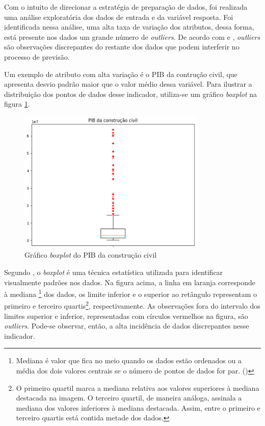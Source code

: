 Com o intuito de direcionar a estratégia de preparação de dados,
foi realizada uma análise exploratória dos dados de 
entrada e da variável resposta. 
Foi identificada nessa análise, uma alta
taxa de variação dos atributos,
dessa forma, está presente nos dados um grande número de \textit{outliers}.
De acordo com \citet{outliers} e \citet{tukey77}, \textit{outliers} são
observações discrepantes do restante dos dados
que podem interferir no processo de previsão. 

Um exemplo de atributo com alta variação é o PIB da contrução civil,
que apresenta desvio padrão maior que o valor médio dessa variável.
Para ilustrar a distribuição dos pontos de dados desse indicador, utiliza-se 
um gráfico \textit{boxplot} na figura \ref{fig:boxplot_pibcc}.

\begin{figure}[H]
    \centering
    \includegraphics[width=9cm]{../figuras/graficos/boxplot-pib-cc.png}
    \caption{Gráfico \textit{boxplot} do PIB da construção civil}
    \label{fig:boxplot_pibcc}
\end{figure}

Segundo \citet{boxplot}, o \textit{boxplot} é
uma técnica estatística utilizada para identificar visualmente padrões nos dados. 
Na figura acima, a linha em laranja corresponde à mediana \footnote{Mediana é
valor que fica no meio quando os dados estão ordenados ou a média
dos dois valores centrais se o número de pontos de dados for par.
(\cite{boxplot-stat})} 
dos dados, os limite inferior e o superior ao retângulo representam
o primeiro e terceiro quartis\footnote{O primeiro quartil marca a mediana 
relativa aos valores superiores à mediana destacada na imagem. O terceiro quartil,
de maneira análoga, assinala a mediana dos valores inferiores à mediana destacada. 
Assim, entre o primeiro e terceiro quartis está contida metade
dos dados.}, respectivamente. As observações fora do intervalo dos limites 
superior e inferior, representadas com círculos vermelhos na figura, são 
\textit{outliers}. Pode-se observar, então, a alta incidência de dados discrepantes
nesse indicador.

